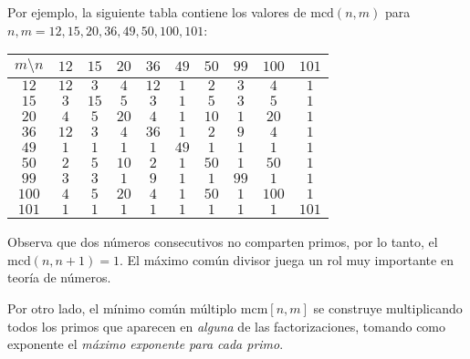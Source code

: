 Por ejemplo, la siguiente tabla contiene los valores de $\mathrm{mcd}(n,m)$ para $n,m= 12,15,20,36,49,50,100,101$:
\begin{center}
\begin{tabular}{|c||c|c|c|c|c|c|c|c|c|} 
 \hline
  $m\setminus n$& $12$ & $15$ & $20$ & $36$ & $49$ & $50$& $99$ & $100$ & $101$ \\ 
  \hline
  \hline
  $12$ & $12$ & $3$ & $4$ & $12$ & $1$ & $2$ & $3$ & $4$ & $1$ \\
  \hline
  $15$ & $3$ & $15$ & $5$ & $3$ & $1$ & $5$ & $3$ & $5$ & $1$ \\
  \hline
  $20$ & $4$ & $5$ & $20$ & $4$ & $1$ & $10$ & $1$ & $20$ & $1$ \\
  \hline
  $36$ & $12$ & $3$ & $4$ & $36$ & $1$ & $2$ & $9$ & $4$ & $1$ \\ 
  \hline
  $49$ & $1$ & $1$ & $1$ & $1$ & $49$ & $1$ & $1$ & $1$ & $1$ \\
  \hline
    $50$ & $2$ & $5$ & $10$ & $2$ & $1$ & $50$ & $1$ & $50$ & $1$ \\
  \hline
    $99$ & $3$ & $3$ & $1$ & $9$ & $1$ & $1$ & $99$ & $1$ & $1$ \\
  \hline
    $100$ & $4$ & $5$ & $20$ & $4$ & $1$ & $50$ & $1$ & $100$ & $1$ \\
  \hline
    $101$ & $1$ & $1$ & $1$ & $1$ & $1$ & $1$ & $1$ & $1$ & $101$ \\
  \hline
  \end{tabular}    
\end{center}
Observa que dos números consecutivos no comparten primos, por lo tanto, el $\mathrm{mcd}(n,n+1)=1$. El máximo común divisor juega un rol muy importante en teoría de números.

Por otro lado, el mínimo común múltiplo $\mathrm{mcm}[n,m]$ se construye multiplicando todos los primos que aparecen en \emph{alguna} de las factorizaciones, tomando como exponente el \emph{máximo exponente para cada primo}.


